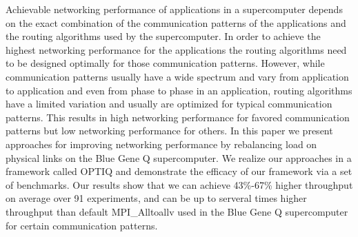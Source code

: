 Achievable networking performance of applications in a supercomputer depends on the exact combination of the communication patterns of the applications and the routing algorithms used by the supercomputer. In order to achieve the highest networking performance for the applications the routing algorithms need to be designed optimally for those communication patterns. However, while communication patterns usually have a wide spectrum and vary from application to application and even from phase to phase in an application, routing algorithms have a limited variation and usually are optimized for typical communication patterns. This results in high networking performance for favored communication patterns but low networking performance for others. In this paper we present approaches for improving networking performance by rebalancing load on physical links on the Blue Gene Q supercomputer. We realize our approaches in a framework called OPTIQ and demonstrate the efficacy of our framework via a set of benchmarks. Our results show that we can achieve 43\%-67\% higher throughput on average over 91 experiments, and can be up to serveral times higher throughput than default MPI\_Alltoallv used in the Blue Gene Q supercomputer for certain communication patterns.
